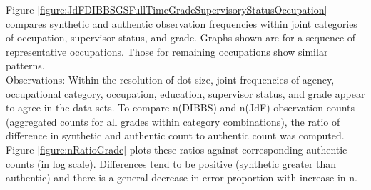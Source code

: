 \documentclass[10pt, letterpaper]{article}
\begin{document}
\begin{spacing}{1.0}
Figure \ref{figure:JdFDIBBSGSFullTimeGradeSupervisoryStatusOccupation} compares synthetic and authentic observation frequencies within joint categories of occupation, supervisor status, and grade.  Graphs shown are for a sequence of representative occupations.  Those for remaining occupations show similar patterns.\\

Observations:  Within the resolution of dot size, joint frequencies of agency, occupational category, occupation, education, supervisor status, and grade appear to agree in the data sets.  To compare n(DIBBS) and n(JdF) observation counts (aggregated counts for all grades within category combinations), the ratio of difference in synthetic and authentic count to authentic count was computed.  Figure \ref{figure:nRatioGrade} plots these ratios against corresponding authentic counts (in log scale).  Differences tend to be positive (synthetic greater than authentic) and there is a general decrease in error proportion with increase in n.

\clearpage


\end{spacing}
\end{document}
